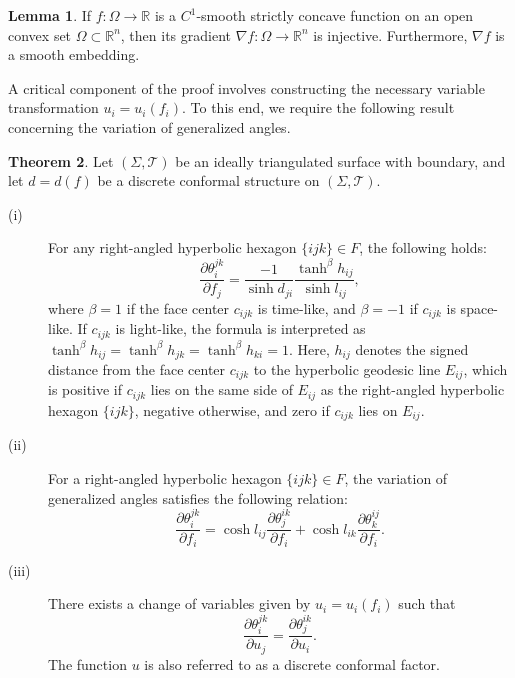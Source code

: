 \documentclass[12pt]{amsart}
\theoremstyle{definition}
\newtheorem{theorem}{Theorem}[section]
\newtheorem{lemma}[theorem]{Lemma}
\begin{document}
\begin{lemma}\label{Lem: analysis}
If $f:\Omega \rightarrow \mathbb{R}$ is a $C^1$-smooth  strictly concave function on an open convex set $\Omega \subset \mathbb{R}^n$,
then its gradient $\nabla f:\Omega \rightarrow \mathbb{R}^n$ is injective.
Furthermore, $\nabla f$ is a smooth embedding.
\end{lemma}

A critical component of the proof involves constructing the necessary variable transformation $u_i=u_i(f_i)$. 
To this end, we require the following result  concerning the variation of generalized angles.

\begin{theorem}\label{Thm: angle variations}
Let $(\Sigma,\mathcal{T})$ be an ideally triangulated surface with boundary, and let $d=d(f)$ be a discrete conformal structure on $(\Sigma,\mathcal{T})$.
\begin{description}
  \item[(i)] For any right-angled hyperbolic hexagon $\{ijk\}\in F$, the following holds:
\begin{equation*}
\frac{\partial \theta^{jk}_i}{\partial f_j}
=\frac{-1}{\sinh d_{ji}}\frac{\tanh^\beta h_{ij}}{\sinh l_{ij}},
\end{equation*}
where $\beta=1$ if the face center $c_{ijk}$ is time-like, and $\beta=-1$ if $c_{ijk}$ is space-like.
If $c_{ijk}$ is light-like, the formula is interpreted as $\tanh^\beta h_{ij}=\tanh^\beta h_{jk}=\tanh^\beta h_{ki}=1$.
Here, $h_{ij}$ denotes the signed distance from the face center $c_{ijk}$ to the hyperbolic geodesic line $E_{ij}$,
which is positive if $c_{ijk}$ lies on the same side of $E_{ij}$ as the right-angled hyperbolic hexagon $\{ijk\}$, negative otherwise, and zero if $c_{ijk}$ lies on $E_{ij}$.

\item[(ii)]
For a right-angled hyperbolic hexagon $\{ijk\}\in F$, the variation of generalized angles satisfies the following relation: 
\begin{equation*}
\frac{\partial \theta^{jk}_i}{\partial f_i}
=\cosh l_{ij}\frac{\partial \theta^{ik}_j}{\partial f_i}
+\cosh l_{ik}\frac{\partial \theta^{ij}_k}{\partial f_i}.
\end{equation*}
  \item[(iii)]
There exists a change of variables given by $u_i=u_i(f_i)$ such that
\begin{equation*}
\frac{\partial \theta^{jk}_i}{\partial u_j}
=\frac{\partial \theta^{ik}_j}{\partial u_i}.
\end{equation*}
The function $u$ is also referred to as a discrete conformal factor.
\end{description}
\end{theorem}
\end{document}
